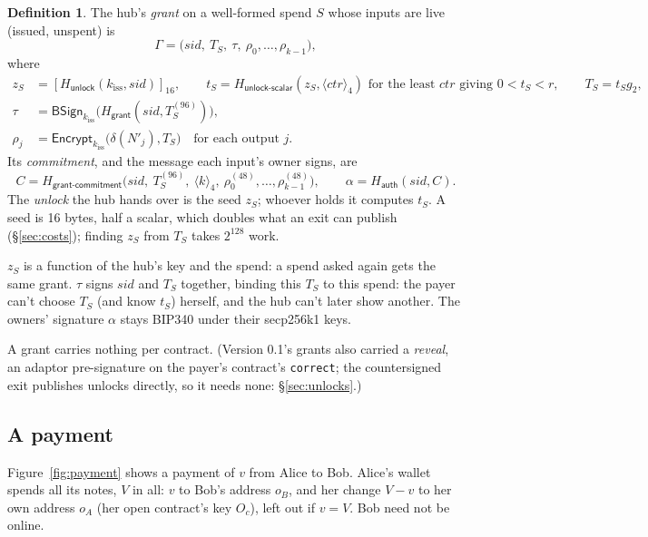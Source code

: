 \documentclass[11pt]{article}
\theoremstyle{plain}
\theoremstyle{definition}
\newtheorem{definition}{Definition}
\newcommand{\tx}[1]{\texttt{#1}}
\newcommand{\be}[2]{\langle #1\rangle_{#2}}
\newcommand{\pre}[2]{[#1]_{#2}}
\newcommand{\Ht}[1]{H_{\textsf{#1}}}
\newcommand{\kiss}{k_{\mathrm{iss}}}
\newcommand{\sid}{\mathit{sid}}
\newcommand{\Oc}{O_c}
\newcommand{\BSign}{\mathsf{BSign}}
\newcommand{\Enc}{\mathsf{Encrypt}}
\begin{document}
\begin{definition}
The hub's \emph{grant} on a well-formed spend $S$ whose inputs are live
(issued, unspent) is
\[
  \Gamma = \big(\sid,\ T_S,\ \tau,\ \rho_0, \dots, \rho_{k-1}\big),
\]
where
\begin{align*}
  z_S &= \pre{\Ht{unlock}(\kiss, \sid)}{16},\qquad
  t_S = \Ht{unlock-scalar}(z_S, \be{\mathit{ctr}}{4}) \text{ for the least
  } \mathit{ctr} \text{ giving } 0 < t_S < r,\qquad T_S = t_S g_2,\\
  \tau &= \BSign_{\kiss}\big(\Ht{grant}(\sid, T_S^{(96)})\big),\\
  \rho_j &= \Enc_{\kiss}\big(\delta(N'_j), T_S\big)\quad \text{for each output } j.
\end{align*}
Its \emph{commitment}, and the message each input's owner signs, are
\[
  C = \Ht{grant-commitment}\big(\sid,\ T_S^{(96)},\ \be{k}{4},\
  \rho_0^{(48)}, \dots, \rho_{k-1}^{(48)}\big),\qquad
  \alpha = \Ht{auth}(\sid, C).
\]
The \emph{unlock} the hub hands over is the seed $z_S$; whoever holds it
computes $t_S$. A seed is 16 bytes, half a scalar, which doubles what an
exit can publish (\S\ref{sec:costs}); finding $z_S$ from $T_S$ takes
$2^{128}$ work.
\end{definition}

$z_S$ is a function of the hub's key and the spend: a spend asked again
gets the same grant. $\tau$ signs $\sid$ and $T_S$ together, binding
this $T_S$ to this spend: the payer can't choose $T_S$ (and know $t_S$)
herself, and the hub can't later show another. The owners' signature
$\alpha$ stays BIP340 under their secp256k1 keys.

A grant carries nothing per contract. (Version 0.1's grants also carried
a \emph{reveal}, an adaptor pre-signature on the payer's contract's
\tx{correct}; the countersigned exit publishes unlocks directly, so it
needs none: \S\ref{sec:unlocks}.)

\subsection{A payment}\label{sec:payment}

Figure~\ref{fig:payment} shows a payment of $v$ from Alice to Bob.
Alice's wallet spends all its notes, $V$ in all: $v$ to Bob's address
$o_B$, and her change $V - v$ to her own address $o_A$ (her open
contract's key $\Oc$), left out if $v = V$. Bob need not be online.
\end{document}
